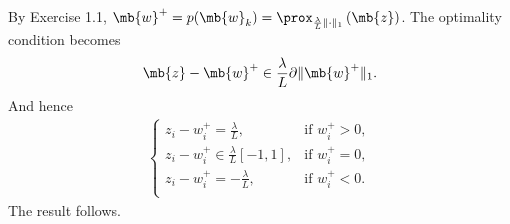 \begin{exercise}
\begin{enumerate}[resume]
            \begin{solution}
                By Exercise 1.1, $\mb{w}^+ = p(\mb{w}_k)=\prox_{\frac{\lambda}{L}\|\cdot\|_1}\left(\mb{z}\right)$. The optimality condition becomes
                \begin{align*}
                    \mb{z} - \mb{w}^+ \in \frac{\lambda}{L}\partial \|\mb{w}^+\|_1.
                \end{align*}
                And hence
                \begin{align*}
                    \begin{cases}
                        z_i - w^+_i =  \frac{\lambda}{L},          & \text{if } w^+_i > 0, \\
                        z_i - w^+_i \in \frac{\lambda}{L} [-1, 1], & \text{if } w^+_i = 0, \\
                        z_i - w^+_i = - \frac{\lambda}{L},         & \text{if } w^+_i < 0. \\
                    \end{cases}
                \end{align*}
                The result follows.\qedhere
            \end{solution}

    \end{enumerate}

\end{exercise}
\clearpage



